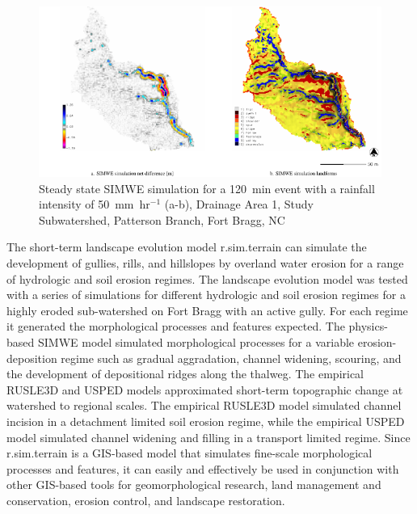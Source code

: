 \documentclass[gmd, manuscript]{copernicus}
\begin{document}
\begin{figure}
\center
\includegraphics[width=\textwidth,height=0.95\textheight,keepaspectratio]{figures/simwe.pdf}
\caption{Steady state SIMWE simulation
for a 120~\unit{min} event with a rainfall intensity of 50~\unit{mm~hr}$^{-1}$ (a-b),
Drainage Area 1, Study Subwatershed, Patterson Branch, Fort Bragg, NC}
\label{fig:simwe_simulations}
\end{figure}

\conclusions

The short-term landscape evolution model 
r.sim.terrain can simulate the development of 
gullies, rills, and hillslopes by overland water erosion
for a range of hydrologic and soil erosion regimes.
The landscape evolution model was tested
with a series of simulations for different 
hydrologic and soil erosion regimes
for a highly eroded sub-watershed on Fort Bragg
with an active gully.
For each regime it generated the 
morphological processes and features expected.
The physics-based SIMWE model 
simulated morphological processes 
for a variable erosion-deposition regime such as 
gradual aggradation, channel widening, 
scouring, and the development of
depositional ridges along the thalweg.
The empirical RUSLE3D and USPED models
approximated short-term topographic change
at watershed to regional scales. 
The empirical RUSLE3D model simulated channel incision
in a detachment limited soil erosion regime,
while the empirical USPED model
simulated channel widening and filling
in a transport limited regime. 
Since r.sim.terrain is a GIS-based model 
that simulates fine-scale morphological processes and features,
it can easily and effectively be used 
in conjunction with other GIS-based tools
for geomorphological research,
land management and conservation,
erosion control, and landscape restoration. 
\end{document}
